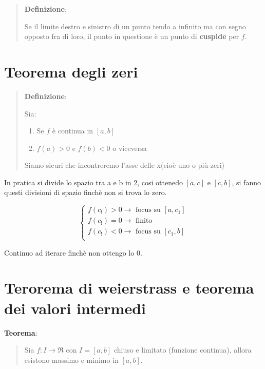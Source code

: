 \documentclass{article}
\begin{document}
\begin{quote}
    \textbf{Definizione}:

    Se il limite destro e sinistro di un punto tendo a infinito ma con segno opposto fra di loro,
    il punto in questione è un punto di \textbf{cuspide} per $f$.
\end{quote}

\section{Teorema degli zeri}
\begin{quote}
    \textbf{Definizione}:

    Sia:
    \begin{enumerate}
        \item Se $f$ è continua in $[a, b]$
        \item $f(a) > 0$ e $f(b) < 0$ o viceversa  
    \end{enumerate}

    Siamo sicuri che incontreremo l'asse delle x(cioè uno o più zeri)
\end{quote}

In pratica si divide lo spazio tra a e b in 2, cosi ottenedo $[a, c]$ e 
$[c, b]$, si fanno questi divisioni di spazio finchè non si trova lo zero.


\begin{equation*}
    \begin{cases}
        f(c_!) > 0 \rightarrow \text{ focus su } [a,c_1] \\
        f(c_!) = 0 \rightarrow \text{ finito}\\
        f(c_!) < 0 \rightarrow \text{ focus su } [c_1, b] \\
    \end{cases}
\end{equation*}

Continuo ad iterare finchè non ottengo lo 0.

\section{Terorema di weierstrass e teorema dei valori intermedi}

\textbf{Teorema}:
\begin{quote}
    Sia $f : I \rightarrow \Re$ con $I = [a, b]$ chiuso e limitato (funzione continua),
    allora esistono massimo e minimo in $[a, b]$. 
\end{quote}
\end{document}
